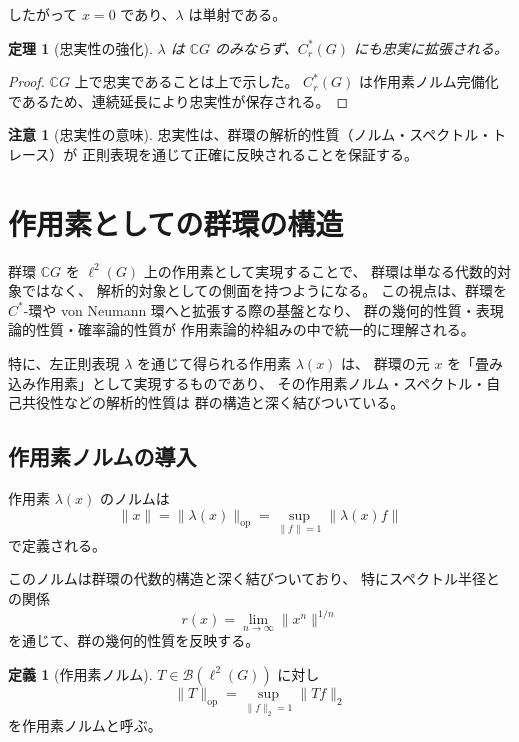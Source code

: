 \documentclass[12pt,a4paper]{ltjarticle}
\newtheorem*{theorem}{定理}
\theoremstyle{definition}
\newtheorem*{definition}{定義}
\newtheorem*{remark}{注意}
\begin{document}
したがって $x = 0$ であり、$\lambda$ は単射である。

\begin{theorem}[忠実性の強化]
$\lambda$ は $\mathbb{C}G$ のみならず、$C_r^*(G)$ にも忠実に拡張される。
\end{theorem}

\begin{proof}
$\mathbb{C}G$ 上で忠実であることは上で示した。
$C_r^*(G)$ は作用素ノルム完備化であるため、連続延長により忠実性が保存される。
\end{proof}

\begin{remark}[忠実性の意味]
忠実性は、群環の解析的性質（ノルム・スペクトル・トレース）が
正則表現を通じて正確に反映されることを保証する。
\end{remark}

\section{作用素としての群環の構造}

群環 $\mathbb{C}G$ を $\ell^2(G)$ 上の作用素として実現することで、
群環は単なる代数的対象ではなく、
解析的対象としての側面を持つようになる。
この視点は、群環を $C^*$-環や von Neumann 環へと拡張する際の基盤となり、
群の幾何的性質・表現論的性質・確率論的性質が
作用素論的枠組みの中で統一的に理解される。

特に、左正則表現 $\lambda$ を通じて得られる作用素 $\lambda(x)$ は、
群環の元 $x$ を「畳み込み作用素」として実現するものであり、
その作用素ノルム・スペクトル・自己共役性などの解析的性質は
群の構造と深く結びついている。

\subsection{作用素ノルムの導入}

作用素 $\lambda(x)$ のノルムは
\[
\|x\| = \|\lambda(x)\|_{\mathrm{op}}
= \sup_{\|f\|=1} \|\lambda(x)f\|
\]
で定義される。

このノルムは群環の代数的構造と深く結びついており、
特にスペクトル半径との関係
\[
r(x) = \lim_{n \to \infty} \|x^n\|^{1/n}
\]
を通じて、群の幾何的性質を反映する。

\begin{definition}[作用素ノルム]
$T\in\mathcal{B}(\ell^2(G))$ に対し
\[
\|T\|_{\mathrm{op}}=\sup_{\|f\|_2=1}\|Tf\|_2
\]
を作用素ノルムと呼ぶ。
\end{definition}
\end{document}
